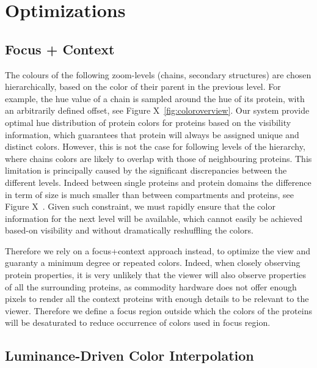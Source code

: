 \documentclass[review,journal]{vgtc}         %
\begin{document}
\section{Optimizations}

\subsection{Focus + Context}

The colours of the following zoom-levels (chains, secondary structures) are chosen hierarchically, based on the color of their parent in the previous level.
For example, the hue value of a chain is sampled around the hue of its protein, with an arbitrarily defined offset, see Figure X~\ref{fig:coloroverview}.
Our system provide optimal hue distribution of protein colors for proteins based on the visibility information, which guarantees that protein will always be assigned unique and distinct colors.
However, this is not the case for following levels of the hierarchy, where chains colors are likely to overlap with those of neighbouring proteins.  
This limitation is principally caused by the significant discrepancies between the different levels.
Indeed between single proteins and protein domains the difference in term of size is much smaller than between compartments and proteins, see Figure X~\cite{noref}.
Given such constraint, we must rapidly ensure that the color information for the next level will be available, which cannot easily be achieved based-on visibility and without dramatically reshuffling the colors.

Therefore we rely on a focus+context approach instead, to optimize the view and guaranty a minimum degree or repeated colors.
Indeed, when closely observing protein properties, it is very unlikely that the viewer will also observe properties of all the surrounding proteins, as commodity hardware does not offer enough pixels to render all the context proteins with enough details to be relevant to the viewer.
Therefore we define a focus region outside which the colors of the proteins will be desaturated to reduce occurrence of colors used in focus region.


\subsection{Luminance-Driven Color Interpolation}


%
%
%
%
%
%
\end{document}
